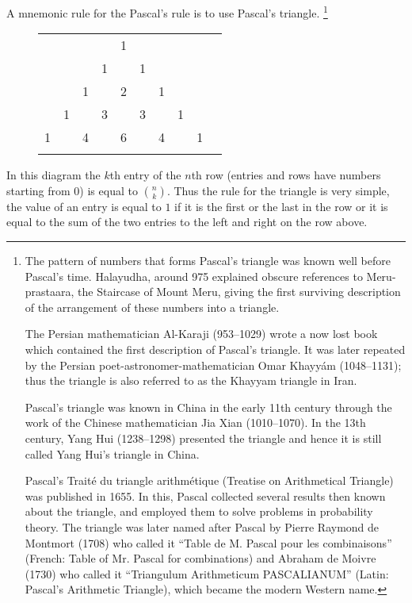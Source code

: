 A mnemonic rule for the Pascal's rule is to use Pascal's triangle.
\footnote{
  The pattern of numbers that forms Pascal's triangle was known well before
  Pascal's time.  Halayudha, around 975 explained obscure references to
  Meru-prastaara, the Staircase of Mount Meru, giving the first surviving
  description of the arrangement of these numbers into a triangle.

  The Persian mathematician Al-Karaji (953–1029) wrote a now lost book which
  contained the first description of Pascal's triangle. It was later repeated by
  the Persian poet-astronomer-mathematician Omar Khayyám (1048–1131); thus the
  triangle is also referred to as the Khayyam triangle in Iran.

  Pascal's triangle was known in China in the early 11th century through the
  work of the Chinese mathematician Jia Xian (1010–1070). In the 13th century,
  Yang Hui (1238–1298) presented the triangle and hence it is still called Yang
  Hui's triangle in China.

  Pascal's Traité du triangle arithmétique (Treatise on Arithmetical Triangle)
  was published in 1655. In this, Pascal collected several results then known
  about the triangle, and employed them to solve problems in probability theory.
  The triangle was later named after Pascal by Pierre Raymond de Montmort (1708)
  who called it ``Table de M. Pascal pour les combinaisons'' (French: Table of
  Mr. Pascal for combinations) and Abraham de Moivre (1730) who called it
  ``Triangulum Arithmeticum PASCALIANUM'' (Latin: Pascal's Arithmetic Triangle),
  which became the modern Western name.
}
\begin{figure}
  \centering
  \begin{tabular}{lccccccccc}
    &    &    &    &  1\\\noalign{\smallskip\smallskip}
    &    &    &  1 &    &  1\\\noalign{\smallskip\smallskip}
    &    &  1 &    &  2 &    &  1\\\noalign{\smallskip\smallskip}
    &  1 &    &  3 &    &  3 &    &  1\\\noalign{\smallskip\smallskip}
    1 &    &  4 &    &  6 &    &  4 &    &  1\\\noalign{\smallskip\smallskip}
  \end{tabular}
\end{figure}
In this diagram the $k$th entry of the $n$th row
(entries and rows have numbers starting from $0$) is equal to $\binom{n}{k}$.
Thus the rule for the triangle is very simple, the value of an entry is equal
to $1$ if it is the first or the last in the row or it is equal to the sum
of the two entries to the left and right on the row above.

